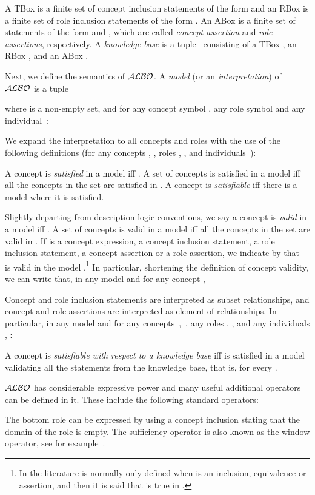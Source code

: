 \documentclass[leqno
,pdflatex
,prodmode
,acmtocl
]{acmsmall}
\newcommand{\mathcmd}[1]{\ensuremath{#1}\xspace}
\newcommand{\dlfont}{\mathcal}
\newcommand{\dl}[1]{\mathcmd{\dlfont{#1}}}
\newcommand{\ALBOid}{\dl{ALBO\smash[t]{\mbox{}}}}
\begin{document}
A TBox is a finite set of concept inclusion statements of the
form  and an RBox is a finite set of
role inclusion statements of the form . 
An ABox is a finite set of statements of the form 
and , which are called \emph{concept assertion} and 
\emph{role assertions}, respectively.
A \emph{knowledge base} is a tuple~
consisting of a TBox , an RBox ,
and an ABox .

Next, we define the semantics of \ALBOid.
A \emph{model} (or an \emph{interpretation})  of \ALBOid is a tuple

where  is a non-empty set, and for any concept symbol , any role
symbol  and any individual~: 

We expand the interpretation  to all concepts and roles with the use of the following definitions
(for
any concepts , , roles , , and individuals~):


A concept  is \emph{satisfied} in a model  iff
.
A set of concepts is satisfied in a model  iff
all the concepts in the set are satisfied in .
A concept is \emph{satisfiable} iff there is a model where it is satisfied.

Slightly departing from description logic conventions, we say 
a concept  is \emph{valid} in a model  iff
.
A set of concepts is valid in a model  iff
all the concepts in the set are valid in .
If  is a concept expression, a concept inclusion statement, a role
inclusion statement, a concept assertion or a role assertion,
we indicate by  that~ is valid in the model .\footnote{In the literature  is
normally only defined when  is an inclusion, equivalence or
assertion, and then it is said that  is true in .}
In particular, shortening the definition of concept validity, we can write that,
in any model  and for any concept , 

Concept and role inclusion statements are interpreted as subset relationships, and
concept and role assertions are interpreted as element-of
relationships. In particular, in any model  and
for any concepts~,~, any roles , , and any individuals , :


A concept  is \emph{satisfiable with respect to a knowledge base
} iff  is satisfied in a
model~ validating all the statements from the knowledge base,
that is,  for every .

\ALBOid has considerable expressive power
and many useful additional operators can be defined in it.
These include the following standard operators:

The bottom role can be expressed by using a concept inclusion stating
that the domain of the role is empty.
The sufficiency operator is also known as the window operator, see for example~\cite{GargovPassyTinchev87}.
\end{document}
